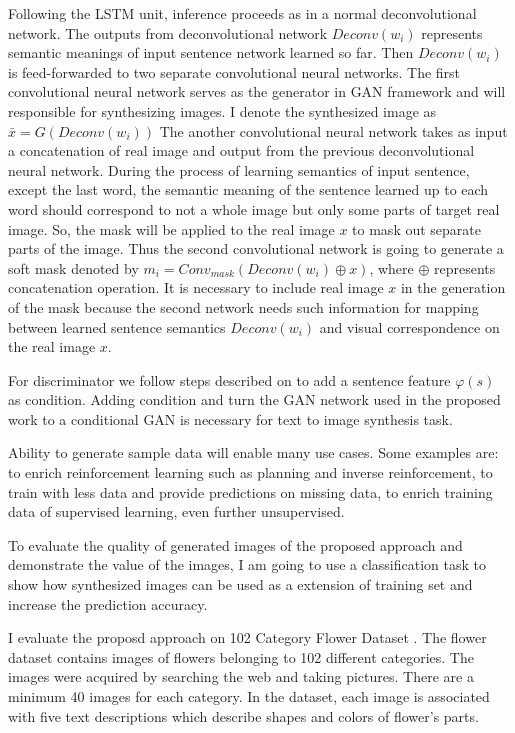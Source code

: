 \documentclass{iitthesis}
\begin{document}
Following the LSTM unit, inference proceeds as in a normal deconvolutional network. The outputs from deconvolutional network $Deconv(w_i)$ represents semantic meanings of input sentence network learned so far. Then $Deconv(w_i)$ is feed-forwarded to two separate convolutional neural networks. The first convolutional neural network serves as the generator in GAN framework and will responsible for synthesizing images. I denote the synthesized image as $\bar{x}=G(Deconv(w_i))$ The another convolutional neural network takes as input a concatenation of real image and output from the previous deconvolutional neural network. During the process of learning semantics of input sentence, except the last word,  the semantic meaning of the sentence learned up to each word should correspond to not a whole image but only some parts of target real image. So, the mask will be applied to the real image $x$ to mask out separate parts of the image. Thus the second convolutional network is going to generate a soft mask denoted by $m_i = Conv_{mask}(Deconv(w_i)\oplus x)$, where $\oplus$ represents concatenation operation. It is necessary to include real image $x$ in the generation of the mask because the second network needs such information for mapping between learned sentence semantics $Deconv(w_i)$ and visual correspondence on the real image $x$. 

For discriminator we follow steps described on \cite{reed2016generative} to add a sentence feature $\varphi(s)$ as condition. Adding condition and turn the GAN network used in the proposed work to a conditional GAN is necessary for text to image synthesis task. 

Ability to generate sample data will enable many use cases. Some examples are: to enrich reinforcement learning such as planning and inverse reinforcement, to train with less data and provide predictions on missing data, to enrich training data of supervised learning, even further unsupervised. 

To evaluate the quality of generated images of the proposed approach and demonstrate the value of the images, I am going to use a classification task to show how synthesized images can be used as a extension of training set and increase the prediction accuracy.

I evaluate the proposd approach on 102 Category Flower Dataset \cite{Nilsback08}. The flower dataset contains images of flowers belonging to 102 different categories. The images were acquired by searching the web and taking pictures. There are a minimum 40 images for each category. In the dataset, each image is associated with five text descriptions which describe shapes and colors of flower's parts. 
\end{document}
